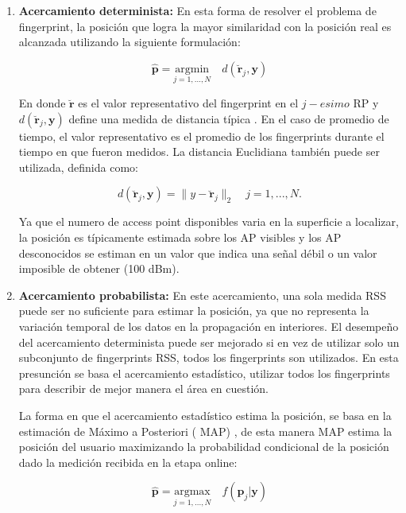 \begin{enumerate}
\item \textbf{Acercamiento determinista:} En esta forma de resolver el problema de fingerprint, la posición que logra la mayor similaridad con la posición real es alcanzada utilizando la siguiente formulación:

\begin{equation}
\hat{\textbf{p}} = \underset{j=1,...,N}{\mathrm{argmin}} \quad d( \breve{\textbf{r}}_{j}, \textbf{y})
\end{equation}

En donde \(\breve{\textbf{r}}\) es el valor representativo del fingerprint en el \(j-esimo\) RP \citep{832252} y \(d( \breve{\textbf{r}}_{j}, \textbf{y}) \) define una medida de distancia típica \citep{6817920}. En el caso de promedio de tiempo, el valor representativo es el promedio de los fingerprints durante el tiempo en que fueron medidos. La distancia Euclidiana también puede ser utilizada, definida como: 

\begin{equation}
d( \breve{\textbf{r}}_{j}, \textbf{y}) = \lVert y - \breve{\textbf{r}}_{j} \rVert_{2} \quad j = 1,..., N.
\end{equation}
   

Ya que el numero de access point disponibles  varia en la superficie a localizar, la posición es típicamente estimada sobre los AP visibles y los AP desconocidos se estiman en un valor que indica una señal débil o un valor imposible de obtener (100 dBm).

\item \textbf{Acercamiento probabilista:} En este acercamiento, una sola medida RSS puede ser no suficiente para estimar la posición, ya que no representa la variación temporal de los datos en la propagación en interiores. El desempeño del acercamiento determinista puede ser mejorado si en vez de utilizar solo un subconjunto de fingerprints RSS, todos los fingerprints son utilizados. En esta presunción se basa el acercamiento estadístico, utilizar todos los fingerprints para describir de mejor manera el área en cuestión.

La forma en que el acercamiento estadístico estima la posición, se basa en la estimación de Máximo a Posteriori ( MAP) \citep{4907834}, de esta manera MAP estima la posición del usuario maximizando la probabilidad condicional de la posición dado la medición recibida en la etapa online:

\begin{equation}
\hat{\textbf{p}} = \underset{j=1,...,N}{\mathrm{argmax}} \quad f( \textbf{p}_{j} \vert \textbf{y})
\end{equation}


\end{enumerate}
